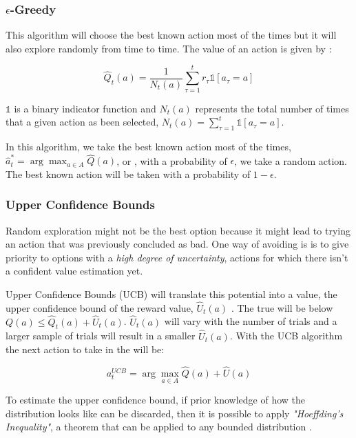 \subsubsection{$\epsilon$-Greedy}
This algorithm will choose the best known action most of the times but it will
also explore randomly from time to time. The value of an action is given by \cite{kn:Weng2018}:

\begin{displaymath}
    \hat{Q}_t(a) = \frac{1}{N_t(a)} \sum_{\tau=1}^t r_\tau \mathds{1}[a_\tau=a]
\end{displaymath}

$\mathds{1}$ is a binary indicator function and $N_t(a)$ represents the total number of
times that a given action as been selected, $N_t(a)= \sum_{\tau=1}^t
\mathds{1}[a_\tau=a]$. 

In this algorithm, we take the best known action most of the times, $\hat{a}^*_t
= \arg \max_{a\in A}\hat{Q}(a)$, or , with a probability of $\epsilon$, we take a
random action. The best known action will be taken with a probability of
$1-\epsilon$.

\subsubsection{Upper Confidence Bounds}
Random exploration might not be the best option because it might lead to trying an
action that was previously concluded as bad. One way of avoiding is is to give
priority to options with a \textit{high degree of uncertainty}, actions for which
there isn't a confident value estimation yet.

Upper Confidence Bounds (UCB) will translate this potential into a value, the
upper confidence bound of the reward value, $\hat{U}_t(a)$ \cite{kn:Weng2018}. The
true will be below $Q(a) \leq \hat{Q}_t(a) + \hat{U}_t(a)$. $\hat{U}_t(a)$ will
vary with the number of trials and a larger sample of trials will result in a
smaller $\hat{U}_t(a)$. With the UCB algorithm the next action to take in the will be:

\begin{displaymath}
a_t^{UCB} = \arg\max_{a\in A}\hat{Q}(a) + \hat{U}(a)
\end{displaymath}

To estimate the upper confidence bound, if prior knowledge of how the distribution
looks like can be discarded, then it is possible to apply \textit{"Hoeffding's
Inequality"}, a theorem that can be applied to any bounded distribution \cite{kn:Silver}.

